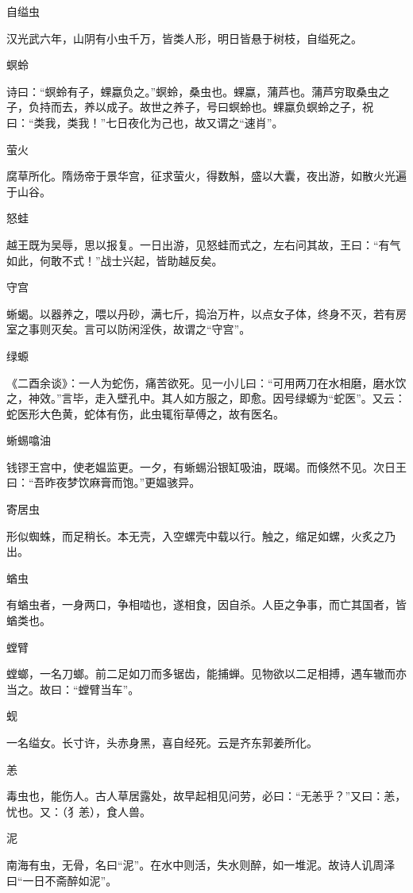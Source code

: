 \documentclass[a4paper,12pt,UTF8,twoside]{ctexbook}
\begin{document}
    自缢虫
    
    汉光武六年，山阴有小虫千万，皆类人形，明日皆悬于树枝，自缢死之。
    
    螟蛉
    
    诗曰：“螟蛉有子，蜾蠃负之。”螟蛉，桑虫也。蜾蠃，蒲芦也。蒲芦穷取桑虫之子，负持而去，养以成子。故世之养子，号曰螟蛉也。蜾蠃负螟蛉之子，祝曰：“类我，类我！”七日夜化为己也，故又谓之“速肖”。
    
    萤火
    
    腐草所化。隋炀帝于景华宫，征求萤火，得数斛，盛以大囊，夜出游，如散火光遍于山谷。
    
    怒蛙
    
    越王既为吴辱，思以报复。一日出游，见怒蛙而式之，左右问其故，王曰：“有气如此，何敢不式！”战士兴起，皆助越反矣。
    
    守宫
    
    蜥蝎。以器养之，喂以丹砂，满七斤，捣治万杵，以点女子体，终身不灭，若有房室之事则灭矣。言可以防闲淫佚，故谓之“守宫”。
    
    绿螈
    
    《二酉余谈》：一人为蛇伤，痛苦欲死。见一小儿曰：“可用两刀在水相磨，磨水饮之，神效。”言毕，走入壁孔中。其人如方服之，即愈。因号绿螈为“蛇医”。又云：蛇医形大色黄，蛇体有伤，此虫辄衔草傅之，故有医名。
    
    蜥蜴噏油
    
    钱镠王宫中，使老媪监更。一夕，有蜥蜴沿银缸吸油，既竭。而倏然不见。次日王曰：“吾昨夜梦饮麻膏而饱。”更媪骇异。
    
    寄居虫
    
    形似蜘蛛，而足稍长。本无壳，入空螺壳中载以行。触之，缩足如螺，火炙之乃出。
    
    蝤虫
    
    有蝤虫者，一身两口，争相啮也，遂相食，因自杀。人臣之争事，而亡其国者，皆蝤类也。
    
    螳臂
    
    螳螂，一名刀螂。前二足如刀而多锯齿，能捕蝉。见物欲以二足相搏，遇车辙而亦当之。故曰：“螳臂当车”。
    
    蚬
    
    一名缢女。长寸许，头赤身黑，喜自经死。云是齐东郭姜所化。
    
    恙
    
    毒虫也，能伤人。古人草居露处，故早起相见问劳，必曰：“无恙乎？”又曰：恙，忧也。又：（犭恙），食人兽。
    
    泥
    
    南海有虫，无骨，名曰“泥”。在水中则活，失水则醉，如一堆泥。故诗人讥周泽曰“一日不斋醉如泥”。
    
\end{document}
